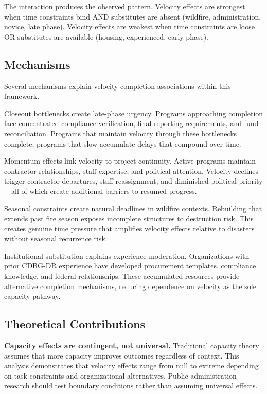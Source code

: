 \documentclass[
  12pt,
  letterpaper,
]{article}
\begin{document}
The interaction produces the observed pattern. Velocity effects are
strongest when time constraints bind AND substitutes are absent
(wildfire, administration, novice, late phase). Velocity effects are
weakest when time constraints are loose OR substitutes are available
(housing, experienced, early phase).

\subsection{Mechanisms}\label{mechanisms}

Several mechanisms explain velocity-completion associations within this
framework.

Closeout bottlenecks create late-phase urgency. Programs approaching
completion face concentrated compliance verification, final reporting
requirements, and fund reconciliation. Programs that maintain velocity
through these bottlenecks complete; programs that slow accumulate delays
that compound over time.

Momentum effects link velocity to project continuity. Active programs
maintain contractor relationships, staff expertise, and political
attention. Velocity declines trigger contractor departures, staff
reassignment, and diminished political priority---all of which create
additional barriers to resumed progress.

Seasonal constraints create natural deadlines in wildfire contexts.
Rebuilding that extends past fire season exposes incomplete structures
to destruction risk. This creates genuine time pressure that amplifies
velocity effects relative to disasters without seasonal recurrence risk.

Institutional substitution explains experience moderation. Organizations
with prior CDBG-DR experience have developed procurement templates,
compliance knowledge, and federal relationships. These accumulated
resources provide alternative completion mechanisms, reducing dependence
on velocity as the sole capacity pathway.

\subsection{Theoretical Contributions}\label{theoretical-contributions}

\textbf{Capacity effects are contingent, not universal.} Traditional
capacity theory assumes that more capacity improves outcomes regardless
of context. This analysis demonstrates that velocity effects range from
null to extreme depending on task constraints and organizational
alternatives. Public administration research should test boundary
conditions rather than assuming universal effects.
\end{document}
